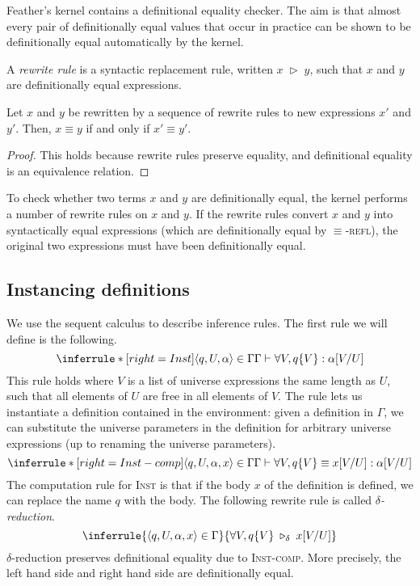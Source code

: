Feather's kernel contains a definitional equality checker.
The aim is that almost every pair of definitionally equal values that occur in practice can be shown to be definitionally equal automatically by the kernel.
\begin{defn}
	A \textit{rewrite rule} is a syntactic replacement rule, written \( x \;\triangleright\; y \), such that \( x \) and \( y \) are definitionally equal expressions.
\end{defn}
\begin{lem}
	Let \( x \) and \( y \) be rewritten by a sequence of rewrite rules to new expressions \( x' \) and \( y' \).
	Then, \( x \equiv y \) if and only if \( x' \equiv y' \).
\end{lem}
\begin{proof}
	This holds because rewrite rules preserve equality, and definitional equality is an equivalence relation.
\end{proof}
To check whether two terms \( x \) and \( y \) are definitionally equal, the kernel performs a number of rewrite rules on \( x \) and \( y \).
If the rewrite rules convert \( x \) and \( y \) into syntactically equal expressions (which are definitionally equal by \( \equiv \)-\textsc{refl}), the original two expressions must have been definitionally equal.

\subsection{Instancing definitions}
We use the sequent calculus to describe inference rules.
The first rule we will define is the following.
\[ \inferrule*[right=Inst]
	{\langle q, U, \alpha \rangle \in \Gamma}
	{\Gamma \vdash \forall V, q\{V\} : \alpha[V/U]} \]
This rule holds where \( V \) is a list of universe expressions the same length as \( U \), such that all elements of \( U \) are free in all elements of \( V \).
The rule lets us instantiate a definition contained in the environment: given a definition in \( \Gamma \), we can substitute the universe parameters in the definition for arbitrary universe expressions (up to renaming the universe parameters).
\[ \inferrule*[right=Inst-comp]
	{\langle q, U, \alpha, x \rangle \in \Gamma}
	{\Gamma \vdash \forall V, q\{V\} \equiv x[V/U] : \alpha[V/U]} \]
The computation rule for \textsc{Inst} is that if the body \( x \) of the definition is defined, we can replace the name \( q \) with the body.
The following rewrite rule is called \textit{\( \delta \)-reduction}.
\[ \inferrule
	{\langle q, U, \alpha, x \rangle \in \Gamma}
	{\forall V, q\{V\} \;\triangleright_\delta\; x[V/U]} \]
\( \delta \)-reduction preserves definitional equality due to \textsc{Inst-comp}.
More precisely, the left hand side and right hand side are definitionally equal.

